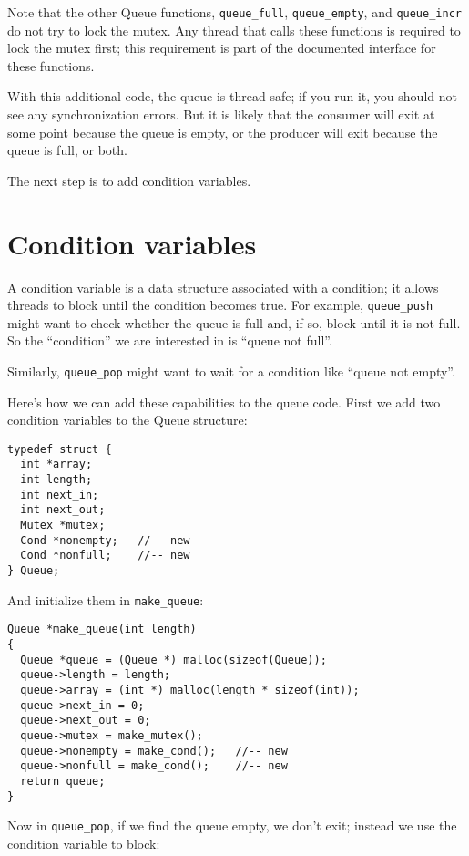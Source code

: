 \documentclass[12pt]{book}
\begin{document}
Note that the other Queue functions, \verb"queue_full",
\verb"queue_empty", and \verb"queue_incr" do not try to lock
the mutex.  Any thread that calls these functions is required to
lock the mutex first; this requirement is part of the documented
interface for these functions.

With this additional code, the queue is thread safe; if you run it, you
should not see any synchronization errors.  But it is likely
that the consumer will exit at some point because the queue is
empty, or the producer will exit because the queue is full,
or both.

The next step is to add condition variables.


\section{Condition variables}

A condition variable is a data structure associated with a condition;
it allows threads to block until the condition becomes true.  For
example, \verb"queue_push" might want to check whether the queue is
full and, if so, block until it is not full.  So the ``condition'' we
are interested in is ``queue not full''.

Similarly, \verb"queue_pop" might want to wait for a condition
like ``queue not empty''.

Here's how we can add these capabilities to the queue code.  First
we add two condition variables to the Queue structure:

\begin{verbatim}
typedef struct {
  int *array;
  int length;
  int next_in;
  int next_out;
  Mutex *mutex;
  Cond *nonempty;   //-- new
  Cond *nonfull;    //-- new
} Queue;
\end{verbatim}

And initialize them in \verb"make_queue":

\begin{verbatim}
Queue *make_queue(int length)
{
  Queue *queue = (Queue *) malloc(sizeof(Queue));
  queue->length = length;
  queue->array = (int *) malloc(length * sizeof(int));
  queue->next_in = 0;
  queue->next_out = 0;
  queue->mutex = make_mutex();
  queue->nonempty = make_cond();   //-- new
  queue->nonfull = make_cond();    //-- new
  return queue;
}
\end{verbatim}

Now in \verb"queue_pop", if we find the queue empty, we don't
exit; instead we use the condition variable to block:
\end{document}
